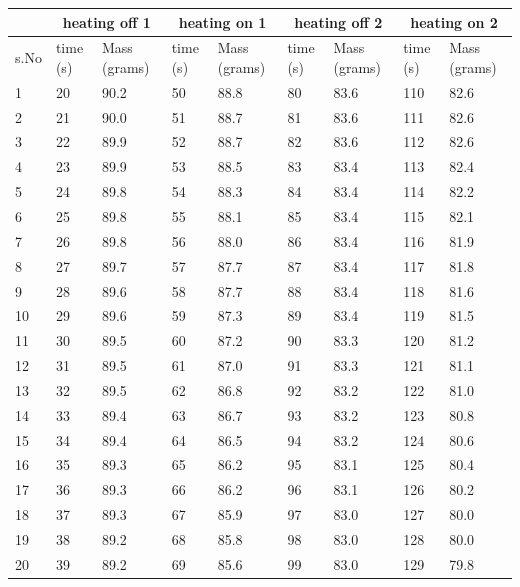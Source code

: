 \begin{center}
\begin{adjustbox}{width=1\textwidth}
\begin{tabular}{|l|l|l|l|l|l|l|l|l|}
\hline
     & \multicolumn{2}{c|}{heating off 1} & \multicolumn{2}{c|}{heating on 1} & \multicolumn{2}{c|}{heating off 2} & \multicolumn{2}{c|}{heating on 2} \\ \hline
s.No & time (s)      & Mass   (grams)     & time (s)     & Mass   (grams)     & time (s)      & Mass   (grams)     & time (s)     & Mass   (grams)     \\ \hline
1  & 20 & 90.2 & 50 & 88.8 & 80  & 83.6 & 110 & 82.6 \\ \hline
2  & 21 & 90.0 & 51 & 88.7 & 81  & 83.6 & 111 & 82.6 \\ \hline
3  & 22 & 89.9 & 52 & 88.7 & 82  & 83.6 & 112 & 82.6 \\ \hline
4  & 23 & 89.9 & 53 & 88.5 & 83  & 83.4 & 113 & 82.4 \\ \hline
5  & 24 & 89.8 & 54 & 88.3 & 84  & 83.4 & 114 & 82.2 \\ \hline
6  & 25 & 89.8 & 55 & 88.1 & 85  & 83.4 & 115 & 82.1 \\ \hline
7  & 26 & 89.8 & 56 & 88.0 & 86  & 83.4 & 116 & 81.9 \\ \hline
8  & 27 & 89.7 & 57 & 87.7 & 87  & 83.4 & 117 & 81.8 \\ \hline
9  & 28 & 89.6 & 58 & 87.7 & 88  & 83.4 & 118 & 81.6 \\ \hline
10 & 29 & 89.6 & 59 & 87.3 & 89  & 83.4 & 119 & 81.5 \\ \hline
11 & 30 & 89.5 & 60 & 87.2 & 90  & 83.3 & 120 & 81.2 \\ \hline
12 & 31 & 89.5 & 61 & 87.0 & 91  & 83.3 & 121 & 81.1 \\ \hline
13 & 32 & 89.5 & 62 & 86.8 & 92  & 83.2 & 122 & 81.0 \\ \hline
14 & 33 & 89.4 & 63 & 86.7 & 93  & 83.2 & 123 & 80.8 \\ \hline
15 & 34 & 89.4 & 64 & 86.5 & 94  & 83.2 & 124 & 80.6 \\ \hline
16 & 35 & 89.3 & 65 & 86.2 & 95  & 83.1 & 125 & 80.4 \\ \hline
17 & 36 & 89.3 & 66 & 86.2 & 96  & 83.1 & 126 & 80.2 \\ \hline
18 & 37 & 89.3 & 67 & 85.9 & 97  & 83.0 & 127 & 80.0 \\ \hline
19 & 38 & 89.2 & 68 & 85.8 & 98  & 83.0 & 128 & 80.0 \\ \hline
20 & 39 & 89.2 & 69 & 85.6 & 99  & 83.0 & 129 & 79.8 \\ \hline

\end{tabular}
\end{adjustbox}
\end{center}
